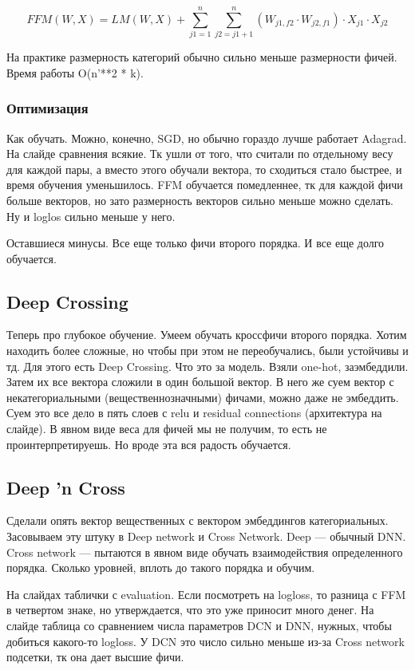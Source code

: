 \documentclass[12pt]{article}
\begin{document}
$$ FFM(W, X) = LM(W, X) + \sum_{j1=1}^{n} {\sum_{j2=j1+1}^{n} (W_{j1,f2} \cdot W_{j2,f1})\cdot X_{j1} \cdot X_{j2}} $$

На практике размерность категорий обычно сильно меньше размерности фичей. Время работы O(n'**2 * k).

\subsubsection{Оптимизация} 

Как обучать. Можно, конечно, SGD, но обычно гораздо лучше работает Adagrad. На слайде сравнения всякие. Тк ушли от того, что считали по отдельному весу для каждой пары, а вместо этого обучали вектора, то сходиться стало быстрее, и время обучения уменьшилось. FFM обучается помедленнее, тк для каждой фичи больше векторов, но зато размерность векторов сильно меньше можно сделать. Ну и loglos сильно меньше у него.

Оставшиеся минусы. Все еще только фичи второго порядка. И все еще долго обучается.

\subsection{Deep Crossing} 

Теперь про глубокое обучение. Умеем обучать кроссфичи второго порядка. Хотим находить более сложные, но чтобы при этом не переобучались, были устойчивы и тд. Для этого есть Deep Crossing. Что это за модель. Взяли one-hot, заэмбеддили. Затем их все вектора сложили в один большой вектор. В него же суем вектор с некатегориальными (вещественнозначными) фичами, можно даже не эмбеддить. Суем это все дело в пять слоев с relu и residual connections (архитектура на слайде). В явном виде веса для фичей мы не получим, то есть не проинтерпретируешь. Но вроде эта вся радость обучается. 

\subsection{Deep 'n Cross} 

Сделали опять вектор вещественных с вектором эмбеддингов категориальных. Засовываем эту штуку в Deep network и Cross Network. Deep --- обычный DNN. Cross network --- пытаются в явном виде обучать взаимодействия определенного порядка. Сколько уровней, вплоть до такого порядка и обучим.

На слайдах таблички с evaluation. Если посмотреть на logloss, то разница с FFM в четвертом знаке, но утверждается, что это уже приносит много денег. На слайде таблица со сравнением числа параметров DCN и DNN, нужных, чтобы добиться какого-то logloss. У DCN это число сильно меньше из-за Cross network подсетки, тк она дает высшие фичи.
\end{document}
